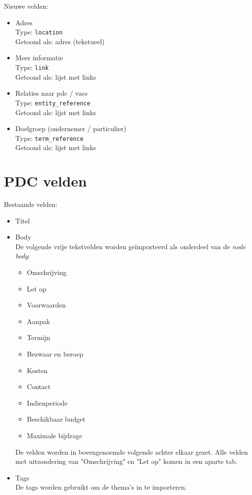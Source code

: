 \documentclass[12pt]{article}
\begin{document}
Nieuwe velden:
\begin{itemize}
\item Adres \\
Type: \texttt{location} \\
Getoond als: adres (tekstueel)
\item Meer informatie \\
Type: \texttt{link} \\
Getoond als: lijst met links
\item Relaties naar pdc / vacs \\
Type: \texttt{entity\_reference} \\
Getoond als: lijst met links
\item Doelgroep (ondernemer / particulier) \\
Type: \texttt{term\_reference} \\
Getoond als: lijst met links
\end{itemize}

\clearpage
\section{PDC velden}
Bestaande velden:
\begin{itemize}
\item Titel
\item Body \\
De volgende vrije tekstvelden worden ge\"{i}mporteerd als onderdeel van de \emph{node body}:
\begin{itemize}
\item Omschrijving
\item Let op
\item Voorwaarden
\item Aanpak
\item Termijn
\item Bezwaar en beroep
\item Kosten
\item Contact
\item Indienperiode
\item Beschikbaar budget
\item Maximale bijdrage
\end{itemize}
De velden worden in bovengenoemde volgende achter elkaar gezet. Alle velden met uitzondering van "Omschrijving" en "Let op" komen in een aparte tab.
\item Tags \\
De tags worden gebruikt om de thema's in te importeren.
\end{itemize}
\end{document}
